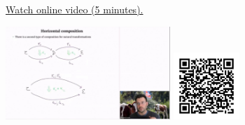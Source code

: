 
\begin{minipage}{10cm}
    \href{https://act4e-spring21.netlify.app/videos/spring2021-nat-trafos:natural-trafos:horizontal-composition.html}{Watch online video (5 minutes).}
        
    \href{https://act4e-spring21.netlify.app/videos/spring2021-nat-trafos:natural-trafos:horizontal-composition.html}{\includegraphics[height=3.5cm]{spring2021-nat-trafos:natural-trafos:horizontal-composition/thumbnails.jpg}}
    \href{https://act4e-spring21.netlify.app/videos/spring2021-nat-trafos:natural-trafos:horizontal-composition.html}{\includegraphics[height=2.5cm]{spring2021-nat-trafos:natural-trafos:horizontal-composition/qrcode.png}}
\end{minipage}
